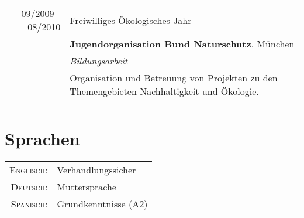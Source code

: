 \documentclass[a4paper,10pt]{article} %
\begin{document}
\begin{tabular}{r|p{11cm}}
 
\textsc{09/2009 - 08/2010} & Freiwilliges Ökologisches Jahr \\
                           & \textbf{Jugendorganisation Bund Naturschutz}, München\\
                           & \emph{Bildungsarbeit}\\
                           & \small{Organisation und Betreuung von Projekten zu den Themengebieten Nachhaltigkeit und Ökologie.}\\
\multicolumn{2}{c}{} \\
 
\end{tabular}
 
 
 
 
 
 
\section{Sprachen}
 
\begin{tabular}{rl}
\textsc{Englisch:} & Verhandlungssicher\\
 
\textsc{Deutsch:} & Muttersprache\\
 
  \textsc{Spanisch:} & Grundkenntnisse (A2)\\
\end{tabular}
 
\end{document}
